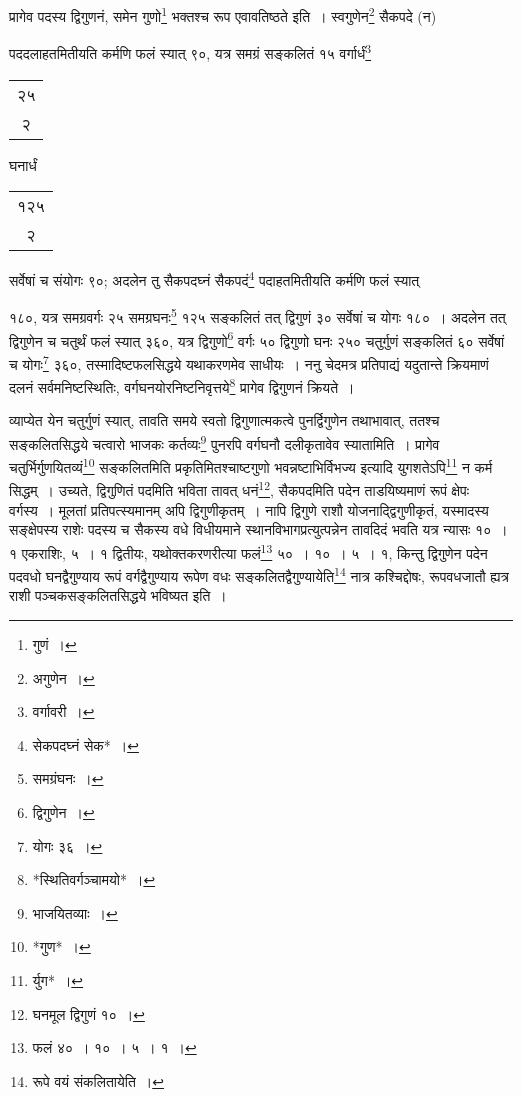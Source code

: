 \documentclass[10pt, openany]{book}
\begin{document}
{{{{{{{{{{{{{{{प्रागेव पदस्य द्विगुणनं, समेन गुणो\renewcommand{\thefootnote}{२०}\footnote{गुणं~।}  भक्तश्च रूप एवावतिष्ठते इति~। 
स्वगुणेन\renewcommand{\thefootnote}{२१}\footnote{अगुणेन~।}  सैकपदे (न)}
{पददलाहतमितीयति कर्मणि फलं स्यात् ९०, यत्र समग्रं सङ्कलितं १५ वर्गार्धं\renewcommand{\thefootnote}{२२}\footnote{वर्गावरी~।}\begin{tabular}{c}२५\\२ \end{tabular}घनार्धं\begin{tabular}{c}१२५\\२ \end{tabular}सर्वेषां च संयोगः ९०; अदलेन तु सैकपदघ्नं सैकपदं\renewcommand{\thefootnote}{२३}\footnote{सेकपदघ्नं सेक*~।} पदाहतमितीयति
कर्मणि फलं स्यात्}
{१८०, यत्र समग्रवर्गः २५ समग्रघनः\renewcommand{\thefootnote}{२४}\footnote{समग्रंघनः~।} १२५ सङ्कलितं तत् द्विगुणं ३०
सर्वेषां च योगः १८०~।}
{अदलेन तत् द्विगुणेन च चतुर्थं फलं स्यात् ३६०, यत्र द्विगुणो\renewcommand{\thefootnote}{२५}\footnote{द्विगुणेन~।} 
वर्गः ५० द्विगुणो घनः २५०}
{चतुर्गुणं सङ्कलितं ६० सर्वेषां च योगः\renewcommand{\thefootnote}{२६}\footnote{योगः ३६~।}  ३६०, तस्मादिष्टफलसिद्धये
यथाकरणमेव साधीयः~।}
{ननु चेदमत्र प्रतिपाद्यं यदुतान्ते क्रियमाणं दलनं सर्वमनिष्टस्थितिः,
वर्गघनयोरनिष्टनिवृत्तये\renewcommand{\thefootnote}{२७}\footnote{*स्थितिवर्गञ्चामयो*~।}} प्रागेव द्विगुणनं क्रियते~। 

\newpage

{व्याप्येत येन चतुर्गुणं स्यात्, तावति समये स्वतो द्विगुणात्मकत्वे
पुनर्द्विगुणेन तथाभावात्,}
{ततश्च सङ्कलितसिद्धये चत्वारो भाजकः कर्तव्यः\renewcommand{\thefootnote}{१}\footnote{भाजयितव्याः~।} पुनरपि वर्गघनौ दलीकृतावेव
स्यातामिति~।}
{प्रागेव चतुर्भिर्गुणयितव्यं\renewcommand{\thefootnote}{२}\footnote{*गुण*~।} सङ्कलितमिति प्रकृतिमितश्चाष्टगुणो
भवन्नष्टाभिर्विभज्य इत्यादि}
{युगशतेऽपि\renewcommand{\thefootnote}{३}\footnote{र्युग*~।} न कर्म सिद्धम्~। उच्यते, द्विगुणितं पदमिति भविता तावत्
धनं\renewcommand{\thefootnote}{४}\footnote{घनमूल द्विगुणं १०~।},}
{सैकपदमिति पदेन ताडयिष्यमाणं रूपं क्षेपः वर्गस्य~। मूलतां
प्रतिपत्स्यमानम् अपि द्विगुणीकृतम्~।}
{नापि द्विगुणे राशौ योजनाद्द्विगुणीकृतं, यस्मादस्य सङ्क्षेपस्य राशेः पदस्य
च सैकस्य वधे}
{विधीयमाने स्थानविभागप्रत्युत्पन्नेन तावदिदं भवति यत्र न्यासः १०~। १
एकराशिः, ५~। १}
{द्वितीयः, यथोक्तकरणरीत्या फलं\renewcommand{\thefootnote}{५}\footnote{फलं ४०~। १०~। ५~। १~।} ५०~। १०~। ५~। १, किन्तु द्विगुणेन पदेन
पदवधो}
{घनद्वैगुण्याय रूपं वर्गद्वैगुण्याय रूपेण वधः सङ्कलितद्वैगुण्यायेति\renewcommand{\thefootnote}{६}\footnote{रूपे वयं संकलितायेति~।}
नात्र कश्चिद्दोषः, रूपवधजातौ}
{ह्यत्र राशी पञ्चकसङ्कलितसिद्धये भविष्यत इति~।}
\vspace{3mm}

}}}}}}}}}}}}}}
\end{document}
